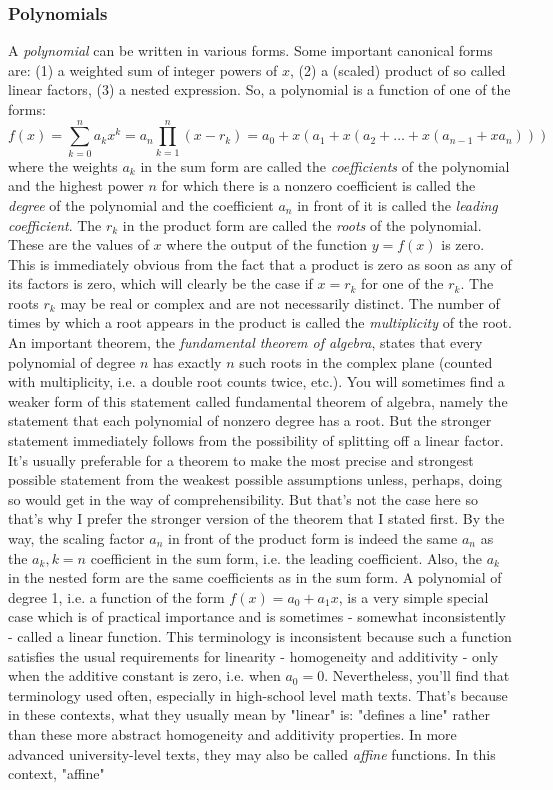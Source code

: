 \subsubsection{Polynomials}
A \emph{polynomial} can be written in various forms. Some important canonical forms are: (1) a weighted sum of integer powers of $x$, (2) a (scaled) product of so called linear factors, (3) a nested expression. So, a polynomial is a function of one of the forms:
\begin{equation}
 f(x) = \sum_{k=0}^n a_k x^k 
      = a_n \prod_{k=1}^{n} (x - r_k)
      = a_0 + x(a_1 + x(a_2 + \ldots + x(a_{n-1} + x a_n)))
\end{equation}
where the weights $a_k$ in the sum form are called the \emph{coefficients} of the polynomial and the highest power $n$ for which there is a nonzero coefficient is called the \emph{degree} of the polynomial and the coefficient $a_n$ in front of it is called the \emph{leading coefficient}. The $r_k$ in the product form are called the \emph{roots} of the polynomial. These are the values of $x$ where the output of the function $y = f(x)$ is zero. This is immediately obvious from the fact that a product is zero as soon as any of its factors is zero, which will clearly be the case if $x = r_k$ for one of the $r_k$. The roots $r_k$ may be real or complex and are not necessarily distinct. The number of times by which a root appears in the product is called the \emph{multiplicity} of the root. An important theorem, the \emph{fundamental theorem of algebra}, states that every polynomial of degree $n$ has exactly $n$ such roots in the complex plane (counted with multiplicity, i.e. a double root counts twice, etc.). You will sometimes find a weaker form of this statement called fundamental theorem of algebra, namely the statement that each polynomial of nonzero degree has a root. But the stronger statement immediately follows from the possibility of splitting off a linear factor. It's usually preferable for a theorem to make the most precise and strongest possible statement from the weakest possible assumptions unless, perhaps, doing so would get in the way of comprehensibility. But that's not the case here so that's why I prefer the stronger version of the theorem that I stated first. By the way, the scaling factor $a_n$ in front of the product form is indeed the same $a_n$ as the $a_k, k=n$ coefficient in the sum form, i.e. the leading coefficient. Also, the $a_k$ in the nested form are the same coefficients as in the sum form. A polynomial of degree 1, i.e. a function of the form $f(x) = a_0 + a_1  x$, is a very simple special case which is of practical importance and is sometimes - somewhat inconsistently - called a linear function. This terminology is inconsistent because such a function satisfies the usual requirements for linearity - homogeneity and additivity - only when the additive constant is zero, i.e. when $a_0 = 0$. Nevertheless, you'll find that terminology used often, especially in high-school level math texts. That's because in these contexts, what they usually mean by "linear" is: "defines a line" rather than these more abstract homogeneity and additivity properties. In more advanced university-level texts, they may also be called \emph{affine} functions. In this context, "affine" 